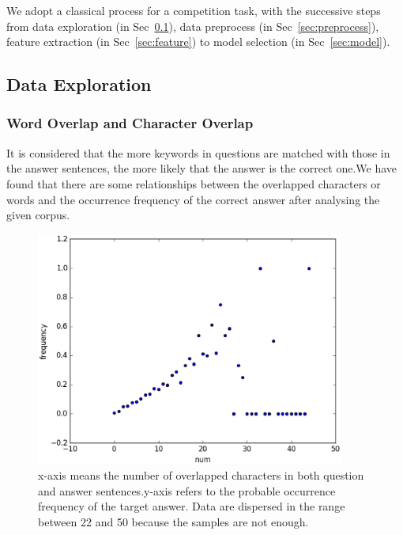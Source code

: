 \documentclass{llncs}
\begin{document}
We adopt a classical process for a competition task, with the successive steps from data exploration (in Sec~\ref{sec:exploration}), data preprocess (in Sec~\ref{sec:preprocess}), feature extraction (in Sec~\ref{sec:feature}) to model selection (in Sec~\ref{sec:model}).

\subsection{Data Exploration}
\label{sec:exploration}
\subsubsection{Word Overlap and Character Overlap}
It is considered that the more keywords in questions are matched with those in the answer sentences, the more likely that the answer is the correct one.We have found that there are some relationships between the overlapped characters or words and the occurrence frequency of the correct answer after analysing the given corpus.


\begin{figure}[htb]
\centering
\includegraphics[width=4in]{figures/character_overlap.eps}
\caption{x-axis means the number of overlapped characters in both question and answer sentences.y-axis refers to the probable occurrence frequency of the target answer. Data are dispersed in the range between 22 and 50 because the samples are not enough.}
\label{fig:character_overlap}
\end{figure}
\end{document}
